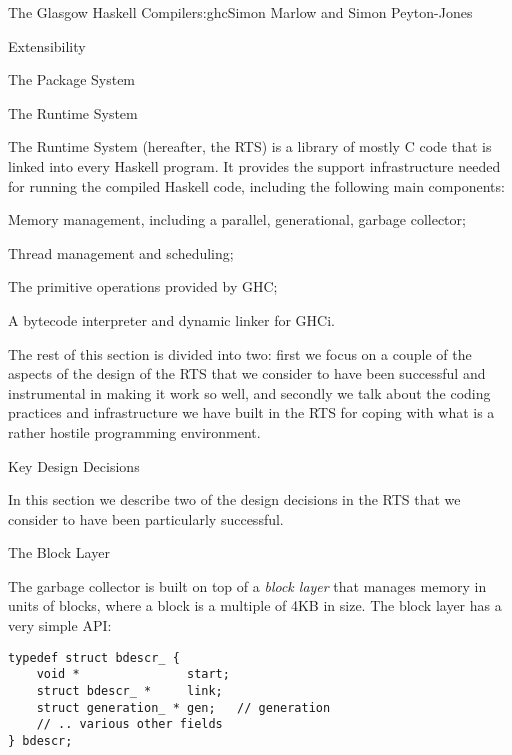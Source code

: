 \begin{aosachapter}{The Glasgow Haskell Compiler}{s:ghc}{Simon Marlow and Simon Peyton-Jones}
\begin{aosasect1}{Extensibility}
\begin{aosasect2}{The Package System}
\end{aosasect2}

\end{aosasect1}

\begin{aosasect1}{The Runtime System}
\label{s:rts}

The Runtime System (hereafter, the RTS) is a library of mostly C code
that is linked into every Haskell program.  It provides the support
infrastructure needed for running the compiled Haskell code, including
the following main components:

\begin{aosaitemize}

\item Memory management, including a parallel, generational, garbage
  collector;

\item Thread management and scheduling;

\item The primitive operations provided by GHC;

\item A bytecode interpreter and dynamic linker for GHCi.

\end{aosaitemize}

The rest of this section is divided into two: first we focus on a
couple of the aspects of the design of the RTS that we consider to
have been successful and instrumental in making it work so well, and
secondly we talk about the coding practices and infrastructure we have
built in the RTS for coping with what is a rather hostile programming
environment.

\begin{aosasect2}{Key Design Decisions}

In this section we describe two of the design decisions in the RTS
that we consider to have been particularly successful.

\begin{aosasect3}{The Block Layer}

The garbage collector is built on top of a \emph{block layer} that
manages memory in units of blocks, where a block is a multiple of 4KB
in size.  The block layer has a very simple API:

\begin{verbatim}
typedef struct bdescr_ {
    void *               start;
    struct bdescr_ *     link;
    struct generation_ * gen;   // generation
    // .. various other fields
} bdescr;


\end{verbatim}
\end{aosasect3}
\end{aosasect2}
\end{aosasect1}
\end{aosachapter}
